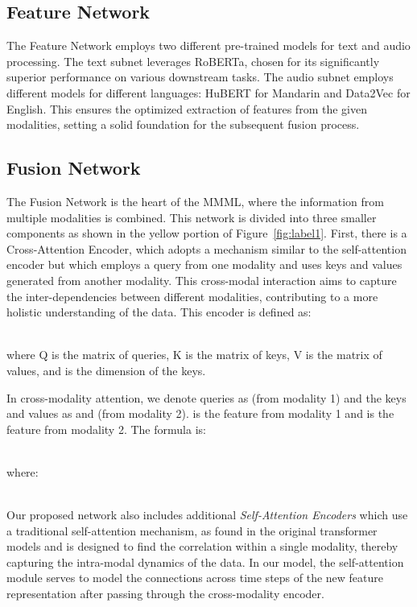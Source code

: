 \documentclass[11pt]{article}
\begin{document}
\subsection{Feature Network}
The Feature Network employs two different pre-trained models for text and audio processing. The text subnet leverages RoBERTa, chosen for its significantly superior performance on various downstream tasks. The audio subnet employs different models for different languages: HuBERT for Mandarin and Data2Vec for English. This ensures the optimized extraction of features from the given modalities, setting a solid foundation for the subsequent fusion process.

\subsection{Fusion Network}
The Fusion Network is the heart of the MMML, where the information from multiple modalities is combined. This network is divided into three smaller components as shown in the yellow portion of Figure~\ref{fig:label1}. First, there is a Cross-Attention Encoder, which adopts a mechanism similar to the self-attention encoder but which employs a query from one modality and uses keys and values generated from another modality. This cross-modal interaction aims to capture the inter-dependencies between different modalities, contributing to a more holistic understanding of the data. This encoder is defined as:

\newenvironment{shrinkeq}[2]{ \bgroup
  \addtolength\abovedisplayshortskip{#1}
  \addtolength\abovedisplayskip{#1}
  \addtolength\belowdisplayshortskip{#2}
  \addtolength\belowdisplayskip{#2}}
{\egroup\ignorespacesafterend}
\begin{shrinkeq}{-1ex}{-3ex}
{\small

}
\end{shrinkeq}\\
where Q is the matrix of queries, K is the matrix of keys, V is the matrix of values, and  is the dimension of the keys.\noindent\ignorespacesafterend

In cross-modality attention, we denote queries as  (from modality 1) and the keys and values as  and  (from modality 2).  is the feature from modality 1 and  is the feature from modality 2. The formula is:
\begin{shrinkeq}{-1ex}{-3ex}
{\small
    
}
\end{shrinkeq}\\
where:   
\begin{shrinkeq}{-1ex}{-3ex}
{\small
    
}
\end{shrinkeq}\\
Our proposed network also includes additional {\it Self-Attention Encoders} which use a traditional self-attention mechanism, as found in the original transformer models and is designed to find the correlation within a single modality, thereby capturing the intra-modal dynamics of the data. In our model, the self-attention module serves to model the connections across time steps of the new feature representation after passing through the cross-modality encoder.
\end{document}

